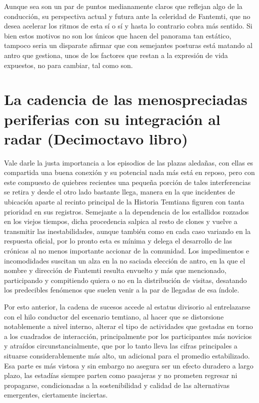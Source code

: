 \documentclass[
]{book}
\begin{document}
Aunque sea son un par de puntos medianamente claros que reflejan algo de la conducción, su perspectiva actual y futura ante la celeridad de Fantemti, que no desea acelerar los ritmos de esta sí o sí y hasta lo contrario cobra más sentido. Si bien estos motivos no son los únicos que hacen del panorama tan estático, tampoco seria un disparate afirmar que con semejantes posturas está matando al antro que gestiona, unos de los factores que restan a la expresión de vida expuestos, no para cambiar, tal como son.

\hypertarget{la-cadencia-de-las-menospreciadas-periferias-con-su-integraciuxf3n-al-radar-decimoctavo-libro}{%
\chapter{La cadencia de las menospreciadas periferias con su integración al radar (Decimoctavo libro)}\label{la-cadencia-de-las-menospreciadas-periferias-con-su-integraciuxf3n-al-radar-decimoctavo-libro}}

Vale darle la justa importancia a los episodios de las plazas aledañas, con ellas es compartida una buena conexión y su potencial nada más está en reposo, pero con este compuesto de quiebres recientes una pequeña porción de tales interferencias se retira y desde el otro lado bastante llega, manera en la que incidentes de ubicación aparte al recinto principal de la Historia Temtiana figuren con tanta prioridad en sus registros. Semejante a la dependencia de los estallidos rozzados en los viejos tiempos, dicha procedencia salpica al resto de clones y vuelve a transmitir las inestabilidades, aunque también como en cada caso variando en la respuesta oficial, por lo pronto esta es mínima y delega el desarrollo de las crónicas al no menos importante accionar de la comunidad. Los impedimentos e incomodidades suscitan un alza en la no saciada elección de antro, en la que el nombre y dirección de Fantemti resulta envuelto y más que mencionado, participando y compitiendo quiera o no en la distribución de visitas, desatando los predecibles fenómenos que suelen venir a la par de llegadas de esa índole.

Por esto anterior, la cadena de sucesos accede al estatus divisorio al entrelazarse con el hilo conductor del escenario temtiano, al hacer que se distorsione notablemente a nivel interno, alterar el tipo de actividades que gestadas en torno a los cuadrados de interacción, principalmente por los participantes más novicios y atraídos circunstancialmente, que por lo tanto lleva las cifras principales a situarse considerablemente más alto, un adicional para el promedio estabilizado. Esa parte es más vistosa y sin embargo no asegura ser un efecto duradero a largo plazo, las estadías siempre parten como pasajeras y no prometen regresar ni propagarse, condicionadas a la sostenibilidad y calidad de las alternativas emergentes, ciertamente inciertas.
\end{document}
